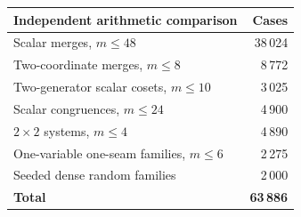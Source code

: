 \begin{center}
\small
\begin{tabular}{lr}
\toprule
Independent arithmetic comparison & Cases\\
\midrule
Scalar merges, $m\le48$ & 38\,024\\
Two-coordinate merges, $m\le8$ & 8\,772\\
Two-generator scalar cosets, $m\le10$ & 3\,025\\
Scalar congruences, $m\le24$ & 4\,900\\
$2\times2$ systems, $m\le4$ & 4\,890\\
One-variable one-seam families, $m\le6$ & 2\,275\\
Seeded dense random families & 2\,000\\
\textbf{Total} & \textbf{63\,886}\\
\bottomrule
\end{tabular}
\end{center}

